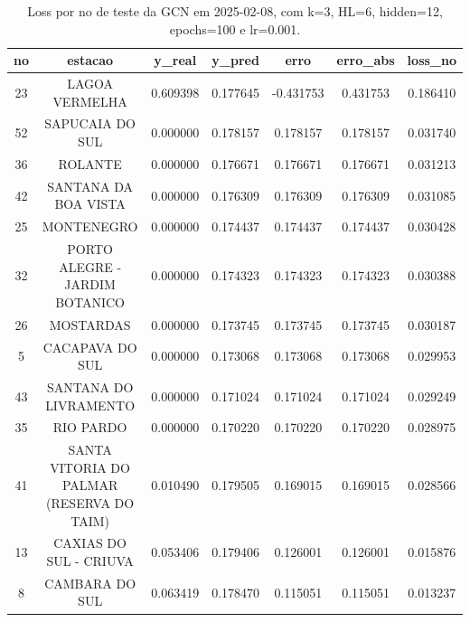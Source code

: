 \begin{table}[h]
\centering
\caption{Loss por no de teste da GCN em 2025-02-08, com k=3, HL=6, hidden=12, epochs=100 e lr=0.001.}
\label{tab:gcn_loss_k3_hl6_h12_e100_d20250208}
\begin{tabular}{ccccccc}
\toprule
no & estacao & y\_real & y\_pred & erro & erro\_abs & loss\_no \\
\midrule
23 & LAGOA VERMELHA & 0.609398 & 0.177645 & -0.431753 & 0.431753 & 0.186410 \\
52 & SAPUCAIA DO SUL & 0.000000 & 0.178157 & 0.178157 & 0.178157 & 0.031740 \\
36 & ROLANTE & 0.000000 & 0.176671 & 0.176671 & 0.176671 & 0.031213 \\
42 & SANTANA DA BOA VISTA & 0.000000 & 0.176309 & 0.176309 & 0.176309 & 0.031085 \\
25 & MONTENEGRO & 0.000000 & 0.174437 & 0.174437 & 0.174437 & 0.030428 \\
32 & PORTO ALEGRE - JARDIM BOTANICO & 0.000000 & 0.174323 & 0.174323 & 0.174323 & 0.030388 \\
26 & MOSTARDAS & 0.000000 & 0.173745 & 0.173745 & 0.173745 & 0.030187 \\
5 & CACAPAVA DO SUL & 0.000000 & 0.173068 & 0.173068 & 0.173068 & 0.029953 \\
43 & SANTANA DO LIVRAMENTO & 0.000000 & 0.171024 & 0.171024 & 0.171024 & 0.029249 \\
35 & RIO PARDO & 0.000000 & 0.170220 & 0.170220 & 0.170220 & 0.028975 \\
41 & SANTA VITORIA DO PALMAR (RESERVA DO TAIM) & 0.010490 & 0.179505 & 0.169015 & 0.169015 & 0.028566 \\
13 & CAXIAS DO SUL - CRIUVA & 0.053406 & 0.179406 & 0.126001 & 0.126001 & 0.015876 \\
8 & CAMBARA DO SUL & 0.063419 & 0.178470 & 0.115051 & 0.115051 & 0.013237 \\
\bottomrule
\end{tabular}
\end{table}
